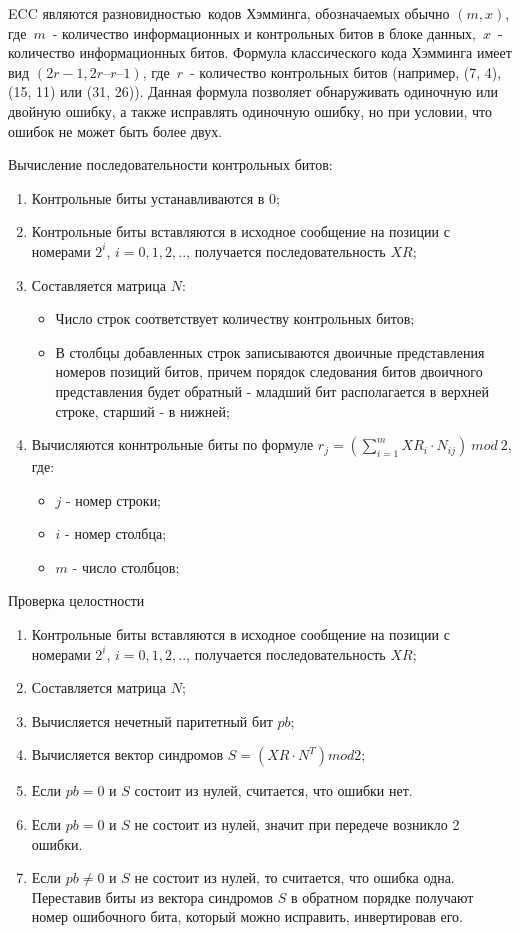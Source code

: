 ECC являются разновидностью кодов Хэмминга, обозначаемых обычно $(m, x)$, где $m$ \--
 количество информационных и контрольных битов в блоке данных, $x$ \-- количество информационных битов.
Формула классического кода Хэмминга имеет вид $(2r - 1, 2r – r – 1)$, где $r$ \-- количество контрольных
битов (например, (7, 4), (15, 11) или (31, 26)). Данная формула позволяет обнаруживать одиночную или
двойную ошибку, а также исправлять одиночную ошибку, но при условии, что ошибок не может быть более двух.

Вычисление последовательности контрольных битов:
\begin{enumerate}
\item Контрольные биты устанавливаются в 0;
\item Контрольные биты вставляются в исходное сообщение на позиции с номерами $2^i$, $i = 0, 1, 2,..$,
получается последовательность $XR$;
\item Составляется матрица $N$:
\begin{itemize}
    \item Число строк соответствует количеству контрольных битов;
    \item В столбцы добавленных строк записываются двоичные представления номеров позиций битов,
    причем порядок следования битов двоичного представления будет обратный \-- младший бит
    располагается в верхней строке, старший \-- в нижней;
\end{itemize}
\item Вычисляются коннтрольные биты по формуле $r_j = (\sum_{i=1}^{m} XR_i \cdot N_{ij}) \ mod \ 2$, где:
\begin{itemize}
    \item $j$ \-- номер строки;
    \item $i$ \-- номер столбца;
    \item $m$ \-- число столбцов;
\end{itemize}

\end{enumerate}

Проверка целостности
\begin{enumerate}
\item Контрольные биты вставляются в исходное сообщение на позиции с номерами $2^i$, $i = 0, 1, 2,..$,
получается последовательность $XR$;
\item Составляется матрица $N$;
\item Вычисляется нечетный паритетный бит $pb$;
\item Вычисляется вектор синдромов $S = (XR \cdot N^T) mod 2$;
\item Если $pb = 0$ и $S$ состоит из нулей, считается, что ошибки нет.
\item Если $pb = 0$ и $S$ не состоит из нулей, значит при передече возникло 2 ошибки.
\item Если $pb \neq 0$ и $S$ не состоит из нулей, то считается, что ошибка одна. Переставив биты из вектора синдромов
$S$ в обратном порядке получают номер ошибочного бита, который можно исправить, инвертировав его.
\end{enumerate}
